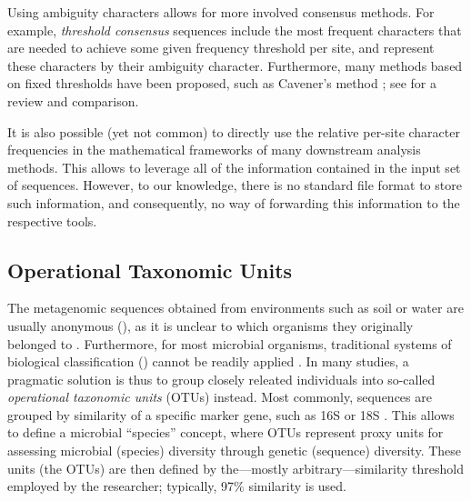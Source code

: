 Using ambiguity characters allows for more involved consensus methods.
For example, \emph{threshold consensus} sequences \cite{Day1992a,Day1992} include the most frequent characters
that are needed to achieve some given frequency threshold per site,
and represent these characters by their ambiguity character.
Furthermore, many methods based on fixed thresholds have been proposed,
such as Cavener's method \cite{Cavener1987,Cavener1991a};
see  for a review and comparison.

It is also possible (yet not common) to directly use the relative per-site character frequencies
in the mathematical frameworks of many downstream analysis methods.
This allows to leverage all of the information contained in the input set of sequences.
However, to our knowledge, there is no standard file format to store such information,
and consequently, no way of forwarding this information to the respective tools.


\subsection{Operational Taxonomic Units}
\label{ch:Foundations:sec:SequenceAnalysis:sub:OTUs}

The metagenomic sequences obtained from environments such as soil or water are usually anonymous
(),
as it is unclear to which organisms they originally belonged to \cite{Oulas2015}.
Furthermore, for most microbial organisms,
traditional systems of biological classification ()
cannot be readily applied \cite{Blaxter2005}.
In many studies, a pragmatic solution is thus to group closely releated individuals into so-called
\emph{operational taxonomic units} (OTUs) \cite{Sokal1963} instead. 
Most commonly, sequences are grouped by similarity of a specific marker gene, such as 16S or 18S \cite{Blaxter2005}.
This allows to define a microbial ``species'' concept,
where \acp{OTU} represent proxy units for assessing microbial (species) diversity through genetic (sequence) diversity.
These units (the \acp{OTU}) are then defined by the---mostly arbitrary---similarity threshold employed by the researcher;
typically, 97\% similarity is used.


